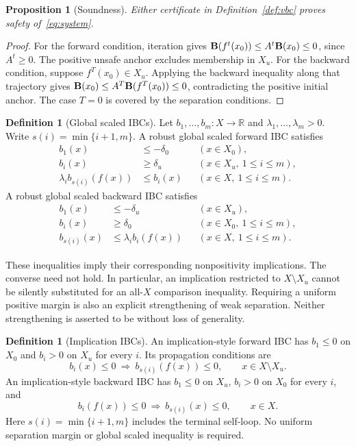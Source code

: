 \documentclass[5p,times]{elsarticle}
\newtheorem{proposition}[theorem]{Proposition}
\theoremstyle{definition}\newtheorem{definition}[theorem]{Definition}
\theoremstyle{remark}\newtheorem{remark}[theorem]{Remark}
\newcommand{\R}{\mathbb R}\newcommand{\N}{\mathbb N}
\begin{document}
\begin{proposition}[Soundness]\label{prop:sound}
Either certificate in Definition~\ref{def:vbc} proves safety of~\eqref{eq:system}.
\end{proposition}
\begin{proof}
For the forward condition, iteration gives $\mathbf B(f^t(x_0))\le A^t\mathbf B(x_0)\le0$, since $A^t\ge0$. The positive unsafe anchor excludes membership in $X_u$. For the backward condition, suppose $f^T(x_0)\in X_u$. Applying the backward inequality along that trajectory gives $\mathbf B(x_0)\le A^T\mathbf B(f^T(x_0))\le0$, contradicting the positive initial anchor. The case $T=0$ is covered by the separation conditions.
\end{proof}

\begin{definition}[Global scaled IBCs]\label{def:ibc}
Let $b_1,\ldots,b_m:X\to\R$ and $\lambda_1,\ldots,\lambda_m>0$. Write $s(i)=\min\{i+1,m\}$. A robust global scaled forward IBC satisfies
\begin{subequations}\label{eq:fi}
\begin{align}
 b_1(x)&\le-\delta_0 &&(x\in X_0),\\
 b_i(x)&\ge\delta_u &&(x\in X_u,\ 1\le i\le m),\\
 \lambda_i b_{s(i)}(f(x))&\le b_i(x) &&(x\in X,\ 1\le i\le m).
\end{align}
\end{subequations}
A robust global scaled backward IBC satisfies
\begin{subequations}\label{eq:bi}
\begin{align}
 b_1(x)&\le-\delta_u &&(x\in X_u),\\
 b_i(x)&\ge\delta_0 &&(x\in X_0,\ 1\le i\le m),\\
 b_{s(i)}(x)&\le\lambda_i b_i(f(x)) &&(x\in X,\ 1\le i\le m).
\end{align}
\end{subequations}
\end{definition}
These inequalities imply their corresponding nonpositivity implications. The converse need not hold. In particular, an implication restricted to $X\setminus X_u$ cannot be silently substituted for an all-$X$ comparison inequality. Requiring a uniform positive margin is also an explicit strengthening of weak separation. Neither strengthening is asserted to be without loss of generality.

\begin{definition}[Implication IBCs]\label{def:imp}
An implication-style forward IBC has $b_1\le0$ on $X_0$ and $b_i>0$ on $X_u$ for every $i$. Its propagation conditions are
\[
 b_i(x)\le0\ \Longrightarrow\ b_{s(i)}(f(x))\le0,
 \qquad x\in X\setminus X_u.
\]
An implication-style backward IBC has $b_1\le0$ on $X_u$, $b_i>0$ on $X_0$ for every $i$, and
\[
 b_i(f(x))\le0\ \Longrightarrow\ b_{s(i)}(x)\le0,
 \qquad x\in X.
\]
Here $s(i)=\min\{i+1,m\}$ includes the terminal self-loop. No uniform separation margin or global scaled inequality is required.
\end{definition}
\end{document}
